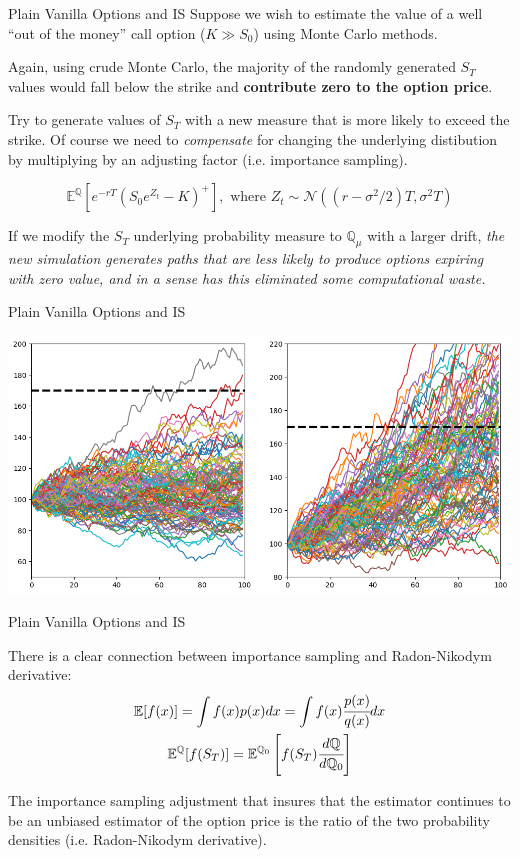 \documentclass{beamer}
\begin{document}
\begin{frame}{Plain Vanilla Options and IS}
Suppose we wish to estimate the value of a well “out of the money” call option ($K \gg S_0$) using Monte Carlo methods.

Again, using crude Monte Carlo, the majority of the randomly generated $S_T$ values would fall below the strike and \textbf{contribute zero to the option price}.

Try to generate values of $S_T$ with a new measure that is more likely to exceed the strike. 
Of course we need to \emph{compensate} for changing the underlying distibution by multiplying by an adjusting factor (i.e. importance sampling).

\begin{equation*}
\mathbb{E}^{\mathbb{Q}}[e^{-rT}(S_0e^{Z_t}-K)^+],\text{ where }Z_t\sim\mathcal{N}((r-\sigma^2/2)T,\sigma^2T)
\end{equation*}

If we modify the $S_T$ underlying probability measure to
$\mathbb{Q}_\mu$ with a larger drift, \emph{the new simulation generates paths that are less likely to produce options expiring with zero value, and in a sense has this eliminated some computational waste.}
\end{frame}


\begin{frame}[fragile]{Plain Vanilla Options and IS}
\begin{center}
	\includegraphics[width=0.95\linewidth]{images/is_call_simulation}
\end{center}	
\end{frame}

\begin{frame}[fragile]{Plain Vanilla Options and IS}

There is a clear connection between importance sampling and Radon-Nikodym derivative:
\begin{gather*}
	\mathbb{E}[f(x)] = \int f(x)p(x) dx = \int f(x) \cfrac{p(x)}{q(x)} dx \\	
	\mathbb{E}^{\mathbb{Q}}[f(S_T)]= \mathbb{E}^{\mathbb{Q}_0}\left[f(S_T)\cfrac{d\mathbb{Q}}{d\mathbb{Q}_0}\right]
\end{gather*}

The importance sampling adjustment that insures that the estimator continues to be an unbiased estimator of the option price is the ratio of the two probability densities (i.e. Radon-Nikodym derivative).
\end{frame}
\end{document}
